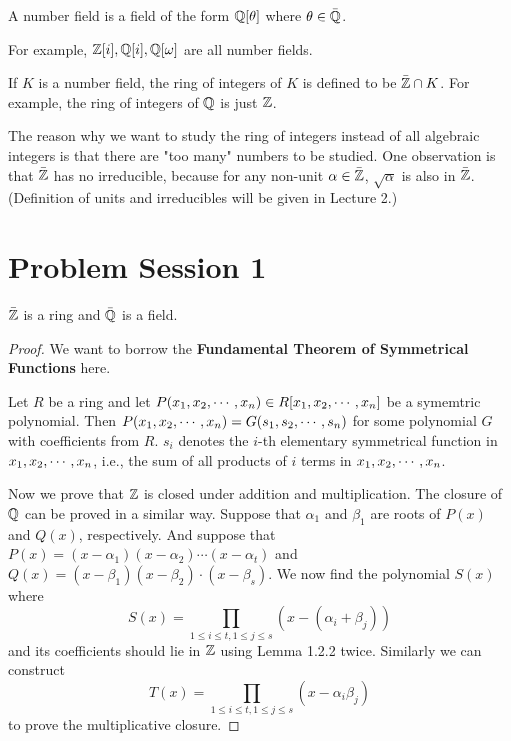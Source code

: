 \documentclass[12pt,twoside=semi,openright,numbers=noenddot]{scrbook}
\begin{document}
\begin{definition}
    A number field is a field of the form $\mathbb Q[\theta]$ where $\theta \in \bar{\mathbb Q}$.
\end{definition}
For example, $\mathbb Z[i], \mathbb Q[i], \mathbb Q[\omega]$ are all number fields.
\begin{definition}
    If $K$ is a number field, the ring of integers of $K$ is defined to be $\bar{\mathbb Z} \cap K$. For example, 
    the ring of integers of $\mathbb Q$ is just $\mathbb Z$.
\end{definition}
The reason why we want to study the ring of integers instead of all algebraic integers 
is that there are "too many" numbers to be studied. One observation is that $\bar{\mathbb Z}$ has no irreducible,
because for any non-unit $\alpha \in \bar{\mathbb Z}$, $\sqrt{\alpha}$ is also in $\bar{\mathbb Z}$. (Definition of units and irreducibles will
be given in Lecture 2.)

\newpage
\section{Problem Session 1}
\begin{problem}
    $\bar{\mathbb Z}$ is a ring and $\bar{\mathbb Q}$ is a field.
\end{problem}
    \begin{proof}
        We want to borrow the \textbf{Fundamental Theorem of Symmetrical Functions} here. \\
        \begin{lemma}
            Let $R$ be a ring and let $P({x}_1, {x}_2, \cdots, {x}_{n}) \in R[{x}_1, {x}_2, \cdots, {x}_{n}]$ be a symemtric polynomial. 
            Then $P({x}_1, {x}_2, \cdots, {x}_{n}) = G({s}_1, {s}_2, \cdots, {s}_{n})$ for some polynomial $G$ with coefficients from $R$.
            $s_i$ denotes the $i$-th elementary symmetrical function in ${x}_1, {x}_2, \cdots, {x}_{n}$, i.e., the sum of all products of $i$ terms 
            in ${x}_1, {x}_2, \cdots, {x}_{n}$.
        \end{lemma}
        Now we prove that $\mathbb Z$ is closed under addition and multiplication. The closure of $\mathbb Q$ can be proved in a similar way.
        Suppose that $\alpha_1$ and $\beta_1$ are roots of $P(x)$ and $Q(x)$, respectively. And suppose that $P(x) = (x-\alpha_1)(x-\alpha_2)\cdots(x-\alpha_t)$ and 
        $Q(x) = (x-\beta_1)(x-\beta_2)\cdot(x-\beta_s)$. We now find the polynomial $S(x)$ where
        $$ S(x) = \prod_{1\leq i \leq t, 1 \leq j \leq s} \left(x-(\alpha_i+\beta_j)\right) $$
        and its coefficients should lie in $\mathbb Z$ using Lemma 1.2.2 twice. Similarly we can construct
        $$T(x) = \prod_{1\leq i \leq t,1 \leq j \leq s} (x-\alpha_i \beta_j)$$
        to prove the multiplicative closure.
    \end{proof}
\end{document}

